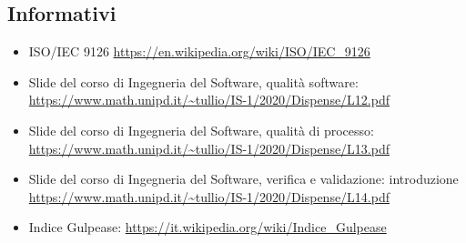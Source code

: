 \documentclass[../piano_di_qualifica.tex]{subfiles}
\begin{document}
\subsection{Informativi}%
\label{sub:info}
\begin{itemize}
\item ISO/IEC 9126 \url{https://en.wikipedia.org/wiki/ISO/IEC_9126}
\item Slide del corso di Ingegneria del Software, qualità software: \url{https://www.math.unipd.it/~tullio/IS-1/2020/Dispense/L12.pdf}
\item Slide del corso di Ingegneria del Software, qualità di processo: \url{https://www.math.unipd.it/~tullio/IS-1/2020/Dispense/L13.pdf}
\item Slide del corso di Ingegneria del Software, verifica e validazione: introduzione \url{https://www.math.unipd.it/~tullio/IS-1/2020/Dispense/L14.pdf}
\item Indice Gulpease: \url{https://it.wikipedia.org/wiki/Indice_Gulpease}
\end{itemize}
\end{document}
